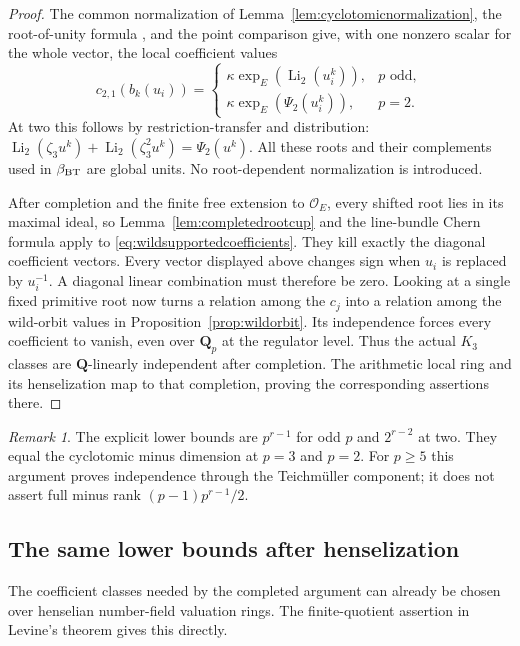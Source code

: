 \documentclass[11pt,a4paper]{article}
\theoremstyle{remark}
\newtheorem{remark}[theorem]{Remark}
\newcommand{\Q}{\mathbf Q}
\newcommand{\OO}{\mathcal O}
\begin{document}
\begin{proof}
The common normalization of
Lemma~\ref{lem:cyclotomicnormalization}, the root-of-unity formula
\cite[Theorem~1.12]{BesserDeJeu}, and the point comparison give,
with one nonzero scalar for the whole vector, the local coefficient
values
\[
 c_{2,1}(b_k(u_i))=
 \begin{cases}
 \kappa\exp_E(\operatorname{Li}_2(u_i^k)),&p\text{ odd},\\
 \kappa\exp_E(\Psi_2(u_i^k)),&p=2.
 \end{cases}
\]
At two this follows by restriction-transfer and distribution:
$\operatorname{Li}_2(\zeta_3u^k)+
\operatorname{Li}_2(\zeta_3^2u^k)=\Psi_2(u^k)$.
All these roots and their complements used in $\beta_{\rm BT}$
are global units. No root-dependent normalization is introduced.

After completion and the finite free extension to
$\OO_E$, every shifted root lies in its maximal ideal, so
Lemma~\ref{lem:completedrootcup} and the line-bundle Chern formula
apply to \eqref{eq:wildsupportedcoefficients}.
They kill exactly the diagonal coefficient vectors.
Every vector displayed above changes sign when $u_i$ is replaced
by $u_i^{-1}$. A diagonal linear combination must therefore be zero.
Looking at a single fixed primitive root now turns a relation
among the $c_j$ into a relation among the wild-orbit values in
Proposition~\ref{prop:wildorbit}. Its independence forces every
coefficient to vanish, even over $\Q_p$ at the regulator level.
Thus the actual $K_3$ classes are $\Q$-linearly independent after
completion. The arithmetic local ring and its henselization map
to that completion, proving the corresponding assertions there.
\end{proof}

\begin{remark}
The explicit lower bounds are $p^{r-1}$ for odd $p$ and
$2^{r-2}$ at two. They equal the cyclotomic minus dimension at
$p=3$ and $p=2$. For $p\geq5$ this argument proves independence
through the Teichm\"uller component; it does not assert full minus
rank $(p-1)p^{r-1}/2$.
\end{remark}


\subsection{The same lower bounds after henselization}
\label{sec:henselianeisenstein}

The coefficient classes needed by the completed argument can already be
chosen over henselian number-field valuation rings.  The finite-quotient
assertion in Levine's theorem gives this directly.
\end{document}
